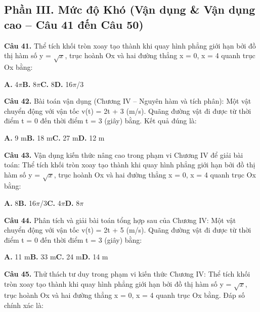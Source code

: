 \documentclass[11pt,a4paper]{article}
\begin{document}
\subsection*{\color{accent} Phần III. Mức độ Khó (Vận dụng \& Vận dụng cao -- Câu 41 đến Câu 50)}
\textbf{\color{primary} Câu 41.} Thể tích khối tròn xoay tạo thành khi quay hình phẳng giới hạn bởi đồ thị hàm số y = $\sqrt{x}$, trục hoành Ox và hai đường thẳng x = 0, x = 4 quanh trục Ox bằng:\par
\hspace*{1.5em}\textbf{A.} 4$\pi$\quad\quad \textbf{B.} 8$\pi$\quad\quad \textbf{C.} 8\quad\quad \textbf{D.} 16$\pi$/3\par\vspace{2pt}
\textbf{\color{primary} Câu 42.} Bài toán vận dụng (Chương IV – Nguyên hàm và tích phân): Một vật chuyển động với vận tốc v(t) = 2t + 3 (m/s). Quãng đường vật đi được từ thời điểm t = 0 đến thời điểm t = 3 (giây) bằng. Kết quả đúng là:\par
\hspace*{1.5em}\textbf{A.} 9 m\quad\quad \textbf{B.} 18 m\quad\quad \textbf{C.} 27 m\quad\quad \textbf{D.} 12 m\par\vspace{2pt}
\textbf{\color{primary} Câu 43.} Vận dụng kiến thức nâng cao trong phạm vi Chương IV để giải bài toán: Thể tích khối tròn xoay tạo thành khi quay hình phẳng giới hạn bởi đồ thị hàm số y = $\sqrt{x}$, trục hoành Ox và hai đường thẳng x = 0, x = 4 quanh trục Ox bằng:\par
\hspace*{1.5em}\textbf{A.} 8\quad\quad \textbf{B.} 16$\pi$/3\quad\quad \textbf{C.} 4$\pi$\quad\quad \textbf{D.} 8$\pi$\par\vspace{2pt}
\textbf{\color{primary} Câu 44.} Phân tích và giải bài toán tổng hợp sau của Chương IV: Một vật chuyển động với vận tốc v(t) = 2t + 5 (m/s). Quãng đường vật đi được từ thời điểm t = 0 đến thời điểm t = 3 (giây) bằng:\par
\hspace*{1.5em}\textbf{A.} 11 m\quad\quad \textbf{B.} 33 m\quad\quad \textbf{C.} 24 m\quad\quad \textbf{D.} 14 m\par\vspace{2pt}
\textbf{\color{primary} Câu 45.} Thử thách tư duy trong phạm vi kiến thức Chương IV: Thể tích khối tròn xoay tạo thành khi quay hình phẳng giới hạn bởi đồ thị hàm số y = $\sqrt{x}$, trục hoành Ox và hai đường thẳng x = 0, x = 4 quanh trục Ox bằng. Đáp số chính xác là:\par
\end{document}
